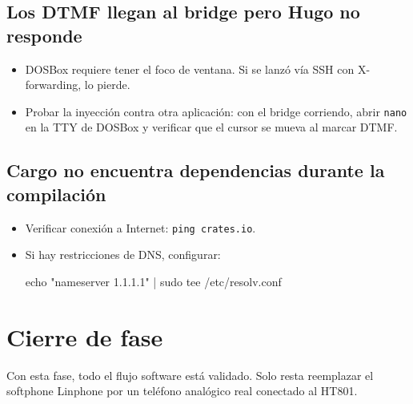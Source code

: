 \subsection{Los DTMF llegan al bridge pero Hugo no responde}

\begin{itemize}
  \item DOSBox requiere tener el foco de ventana. Si se lanzó vía SSH con X-forwarding, lo pierde.
  \item Probar la inyección contra otra aplicación: con el bridge corriendo, abrir \texttt{nano} en la TTY de DOSBox y verificar que el cursor se mueva al marcar DTMF.
\end{itemize}

\subsection{Cargo no encuentra dependencias durante la compilación}

\begin{itemize}
  \item Verificar conexión a Internet: \texttt{ping crates.io}.
  \item Si hay restricciones de DNS, configurar:
  \begin{shellcode}
echo "nameserver 1.1.1.1" | sudo tee /etc/resolv.conf
  \end{shellcode}
\end{itemize}

\section{Cierre de fase}

Con esta fase, todo el flujo software está validado. Solo resta reemplazar el softphone Linphone por un teléfono analógico real conectado al HT801.
